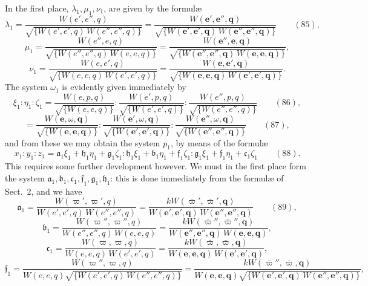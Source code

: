 \documentclass[11pt]{article}
\begin{document}
In the first place, $\lambda_1, \mu_1, \nu_1$, are given by the formul\ae
\[
\lambda_1 = \frac{W(e', e'', q)}{\sqrt{\{W(e', e', q)\,W(e'', e'', q)\}}} = \frac{W(\mathbf{e}', \mathbf{e}'', \mathbf{q})}{\sqrt{\{W(\mathbf{e}', \mathbf{e}', \mathbf{q})\,W(\mathbf{e}'', \mathbf{e}'', \mathbf{q})\}}} \qquad (85),
\]
\[
\mu_1 = \frac{W(e'', e, q)}{\sqrt{\{W(e'', e'', q)\,W(e, e, q)\}}} = \frac{W(\mathbf{e}'', \mathbf{e}, \mathbf{q})}{\sqrt{\{W(\mathbf{e}'', \mathbf{e}'', \mathbf{q})\,W(\mathbf{e}, \mathbf{e}, \mathbf{q})\}}},
\]
\[
\nu_1 = \frac{W(e, e', q)}{\sqrt{\{W(e, e, q)\,W(e', e', q)\}}} = \frac{W(\mathbf{e}, \mathbf{e}', \mathbf{q})}{\sqrt{\{W(\mathbf{e}, \mathbf{e}, \mathbf{q})\,W(\mathbf{e}', \mathbf{e}', \mathbf{q})\}}}.
\]
The system $\omega_1$ is evidently given immediately by
\[
\xi_1 : \eta_1 : \zeta_1 = \frac{W(e, p, q)}{\sqrt{\{W(e, e, q)\}}} : \frac{W(e', p, q)}{\sqrt{\{W(e', e', q)\}}} : \frac{W(e'', p, q)}{\sqrt{\{W(e'', e'', q)\}}} \qquad (86),
\]
\[
= \frac{W(\mathbf{e}, \omega, \mathbf{q})}{\sqrt{\{W(\mathbf{e}, \mathbf{e}, \mathbf{q})\}}} : \frac{W(\mathbf{e}', \omega, \mathbf{q})}{\sqrt{\{W(\mathbf{e}', \mathbf{e}', \mathbf{q})\}}} : \frac{W(\mathbf{e}'', \omega, \mathbf{q})}{\sqrt{\{W(\mathbf{e}'', \mathbf{e}'', \mathbf{q})\}}} \qquad (87),
\]
and from these we may obtain the system $p_1$, by means of the formul\ae
\[
x_1 : y_1 : z_1 = \mathfrak{a}_1\xi_1 + \mathfrak{h}_1\eta_1 + \mathfrak{g}_1\zeta_1 : \mathfrak{h}_1\xi_1 + \mathfrak{b}_1\eta_1 + \mathfrak{f}_1\zeta_1 : \mathfrak{g}_1\xi_1 + \mathfrak{f}_1\eta_1 + \mathfrak{c}_1\zeta_1 \qquad (88).
\]
This requires some further development however. We must in the first place form the system $\mathfrak{a}_1, \mathfrak{b}_1, \mathfrak{c}_1, \mathfrak{f}_1, \mathfrak{g}_1, \mathfrak{h}_1$: this is done immediately from the formul\ae{} of Sect.~2, and we have
\[
\mathfrak{a}_1 = \frac{W(\varpi', \varpi', q)}{W(e', e', q)\,W(e'', e'', q)} = \frac{kW(\bar\varpi', \bar\varpi', \mathbf{q})}{W(\mathbf{e}', \mathbf{e}', \mathbf{q})\,W(\mathbf{e}'', \mathbf{e}'', \mathbf{q})} \qquad (89),
\]
\[
\mathfrak{b}_1 = \frac{W(\varpi'', \varpi'', q)}{W(e'', e'', q)\,W(e, e, q)} = \frac{kW(\bar\varpi'', \bar\varpi'', \mathbf{q})}{W(\mathbf{e}'', \mathbf{e}'', \mathbf{q})\,W(\mathbf{e}, \mathbf{e}, \mathbf{q})},
\]
\[
\mathfrak{c}_1 = \frac{W(\varpi, \varpi, q)}{W(e, e, q)\,W(e', e', q)} = \frac{kW(\bar\varpi, \bar\varpi, \mathbf{q})}{W(\mathbf{e}, \mathbf{e}, \mathbf{q})\,W(\mathbf{e}', \mathbf{e}', \mathbf{q})},
\]
\[
\mathfrak{f}_1 = \frac{W(\varpi'', \varpi, q)}{W(e, e, q)\sqrt{\{W(e', e', q)\,W(e'', e'', q)\}}} = \frac{kW(\bar\varpi'', \bar\varpi, \mathbf{q})}{W(\mathbf{e}, \mathbf{e}, \mathbf{q})\sqrt{\{W(\mathbf{e}', \mathbf{e}', \mathbf{q})\,W(\mathbf{e}'', \mathbf{e}'', \mathbf{q})\}}},
\]
\end{document}

